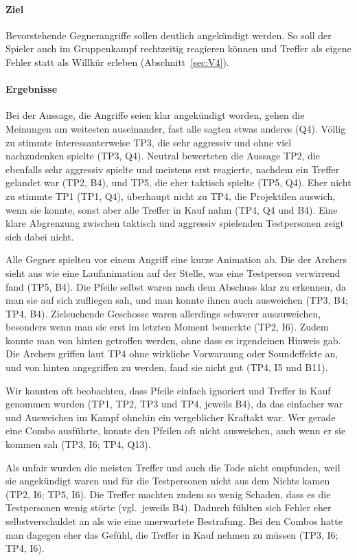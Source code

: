 \documentclass[../Main.tex]{subfiles}
\begin{document}
\paragraph{Ziel}
Bevorstehende Gegnerangriffe sollen deutlich angekündigt werden. So soll der Spieler auch im Gruppenkampf rechtzeitig reagieren können und Treffer als eigene Fehler statt als Willkür erleben (Abschnitt~\ref{sec:V4}).

\paragraph{Ergebnisse}
Bei der Aussage, die Angriffe seien klar angekündigt worden, gehen die Meinungen am weitesten auseinander, fast alle sagten etwas anderes (Q4). Völlig zu stimmte interessanterweise TP3, die sehr aggressiv und ohne viel nachzudenken spielte (TP3, Q4). Neutral bewerteten die Aussage TP2, die ebenfalls sehr aggressiv spielte und meistens erst reagierte, nachdem ein Treffer gelandet war (TP2, B4), und TP5, die eher taktisch spielte (TP5, Q4). Eher nicht zu stimmte TP1 (TP1, Q4), überhaupt nicht zu TP4, die Projektilen auswich, wenn sie konnte, sonst aber alle Treffer in Kauf nahm (TP4, Q4 und B4). Eine klare Abgrenzung zwischen taktisch und aggressiv spielenden Testpersonen zeigt sich dabei nicht.

Alle Gegner spielten vor einem Angriff eine kurze Animation ab. Die der Archers sieht aus wie eine Laufanimation auf der Stelle, was eine Testperson verwirrend fand (TP5, B4). Die Pfeile selbst waren nach dem Abschuss klar zu erkennen, da man sie auf sich zufliegen sah, und man konnte ihnen auch ausweichen (TP3, B4; TP4, B4). Zielsuchende Geschosse waren allerdings schwerer auszuweichen, besonders wenn man sie erst im letzten Moment bemerkte (TP2, I6). Zudem konnte man von hinten getroffen werden, ohne dass es irgendeinen Hinweis gab. Die Archers griffen laut TP4 ohne wirkliche Vorwarnung oder Soundeffekte an, und von hinten angegriffen zu werden, fand sie nicht gut (TP4, I5 und B11).

Wir konnten oft beobachten, dass Pfeile einfach ignoriert und Treffer in Kauf genommen wurden (TP1, TP2, TP3 und TP4, jeweils B4), da das einfacher war und Ausweichen im Kampf ohnehin ein vergeblicher Kraftakt war. Wer gerade eine Combo ausführte, konnte den Pfeilen oft nicht ausweichen, auch wenn er sie kommen sah (TP3, I6; TP4, Q13).

Als unfair wurden die meisten Treffer und auch die Tode nicht empfunden, weil sie angekündigt waren und für die Testpersonen nicht aus dem Nichts kamen (TP2, I6; TP5, I6). Die Treffer machten zudem so wenig Schaden, dass es die Testpersonen wenig störte (vgl.\ jeweils B4). Dadurch fühlten sich Fehler eher selbstverschuldet an als wie eine unerwartete Bestrafung. Bei den Combos hatte man dagegen eher das Gefühl, die Treffer in Kauf nehmen zu müssen (TP3, I6; TP4, I6).
\end{document}
